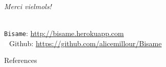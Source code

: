 \documentclass[french]{beamer}
\newcommand{\themename}{\textbf{\textsc{metropolis}}\xspace}
\newcommand{\tool}[1]{\texttt{#1}\xspace}
\begin{document}
\begin{frame}[standout]
  \textit{Merci vielmols!} \\~\\
  \begin{center}
    \normalsize
    \tool{Bisame}: \url{http://bisame.herokuapp.com} \\ 
    
    \includegraphics[width=0.02\textwidth]{figures/github-white.png}\enspace Github:         \url{https://github.com/alicemillour/Bisame}
  \end{center}
\end{frame}


%
%

\begin{frame}[allowframebreaks]{References}

  
  
\end{frame}
\end{document}
